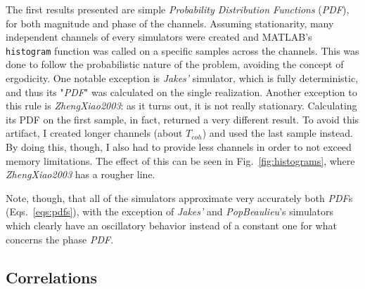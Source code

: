 The first results presented are simple \textit{Probability Distribution Functions} (\textit{PDF}), for both magnitude and phase of the channels. Assuming stationarity, many independent channels of every simulators were created and MATLAB's \texttt{histogram} function was called on a specific samples across the channels. This was done to follow the probabilistic nature of the problem, avoiding the concept of ergodicity. One notable exception is \textit{Jakes'} simulator, which is fully deterministic, and thus its "\textit{PDF}" was calculated on the single realization. Another exception to this rule is \textit{ZhengXiao2003}: as it turns out, it is not really stationary. Calculating its PDF on the first sample, in fact, returned a very different result. To avoid this artifact, I created longer channels (about $T_{coh}$) and used the last sample instead. By doing this, though, I also had to provide less channels in order to not exceed memory limitations. The effect of this can be seen in Fig.~\ref{fig:histograms}, where \textit{ZhengXiao2003} has a rougher line.

Note, though, that all of the simulators approximate very accurately both \textit{PDF}s (Eqs.~\ref{eqs:pdfs}), with the exception of \textit{Jakes'} and \textit{PopBeaulieu}'s simulators which clearly have an oscillatory behavior instead of a constant one for what concerns the phase \textit{PDF}.

\subsection{Correlations}

